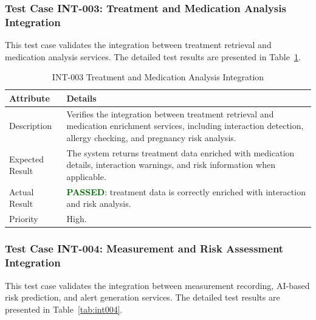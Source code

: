 \subsubsection{Test Case INT-003: Treatment and Medication Analysis Integration}

This test case validates the integration between treatment retrieval and medication analysis services. The detailed test results are presented in Table~\ref{tab:int003}.

\begin{table}[H]
\centering
\caption{INT-003 Treatment and Medication Analysis Integration}
\label{tab:int003}
\renewcommand{\arraystretch}{1.3}

\begin{tabular}{|p{2cm}|p{13cm}|}
\hline
\rowcolor{blue!10}
\textbf{Attribute} & \textbf{Details} \\
\hline
Description & Verifies the integration between treatment retrieval and medication enrichment services, including interaction detection, allergy checking, and pregnancy risk analysis. \\
\hline
Expected Result & The system returns treatment data enriched with medication details, interaction warnings, and risk information when applicable. \\
\hline
Actual Result & \textbf{\textcolor{darkgreen}{PASSED}}: treatment data is correctly enriched with interaction and risk analysis. \\
\hline
Priority & High. \\
\hline
\end{tabular}
\end{table}

\subsubsection{Test Case INT-004: Measurement and Risk Assessment Integration}

This test case validates the integration between measurement recording, AI-based risk prediction, and alert generation services. The detailed test results are presented in Table~\ref{tab:int004}.

